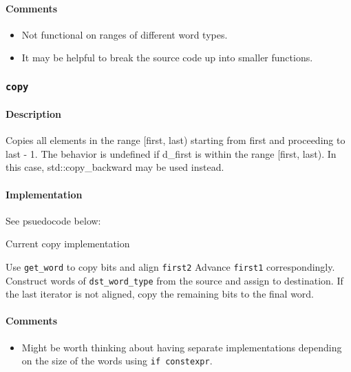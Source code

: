 \documentclass[letterpaper, 8pt]{article}
\begin{document}
\paragraph{Comments}
\begin{itemize}
    \item Not functional on ranges of different word types. 
    \item It may be helpful to break the source code up into smaller functions. 
\end{itemize}

\subsubsection{\texttt{copy}}
\label{subsubsec:copy}
\paragraph{Description}
Copies all elements in the range [first, last) starting from first and 
proceeding to last - 1. The behavior is undefined if d\_first is within the 
range [first, last). In this case, std::copy\_backward may be used instead.

\paragraph{Implementation}
See psuedocode below:
\begin{algorithm}[H]
    \caption{Current copy implementation}
    \begin{algorithmic}[1]
            \State Use \texttt{get\_word} to copy bits and align \texttt{first2}
            \State Advance \texttt{first1} correspondingly.
        \EndIf
            \State Construct words of \texttt{dst\_word\_type}
            from the source and assign to destination.
        \EndWhile
        \State If the last iterator is not aligned, copy the remaining bits to 
            the final word.
        \EndFunction
    \end{algorithmic}
\end{algorithm}
\paragraph{Comments}
\begin{itemize}
    \item Might be worth thinking about having separate implementations 
        depending on the size of the words using \texttt{if constexpr}.
\end{itemize}
\end{document}
